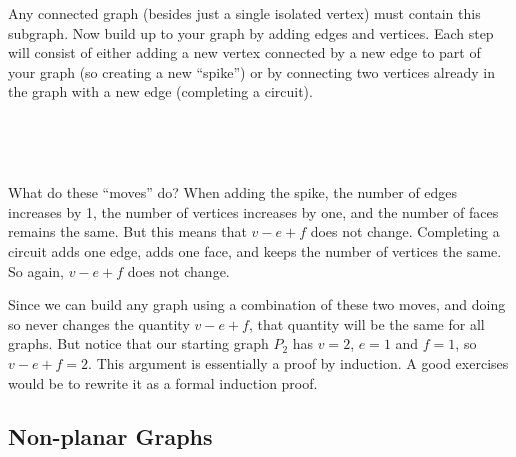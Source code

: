 \documentclass[12pt]{article}
\begin{document}
Any connected graph (besides just a single isolated vertex) must contain this subgraph.  Now build up to your graph by adding edges and vertices.  Each step will consist of either adding a new vertex connected by a new edge to part of your graph (so creating a new ``spike'') or by connecting two vertices already in the graph with a new edge (completing a circuit).

\begin{center}
  ~ \hfill
  \hfill
  \hfill ~
\end{center}

What do these ``moves'' do?  When adding the spike, the number of edges increases by 1, the number of vertices increases by one, and the number of faces remains the same.  But this means that $v - e + f$ does not change.  Completing a circuit adds one edge, adds one face, and keeps the number of vertices the same.  So again, $v - e + f$ does not change.

Since we can build any graph using a combination of these two moves, and doing so never changes the quantity $v - e + f$, that quantity will be the same for all graphs.  But notice that our starting graph $P_2$ has $v = 2$, $e = 1$ and $f = 1$, so $v - e + f = 2$.  This argument is essentially a proof by induction.  A good exercises would be to rewrite it as a formal induction proof.

\subsection{Non-planar Graphs}
\end{document}
